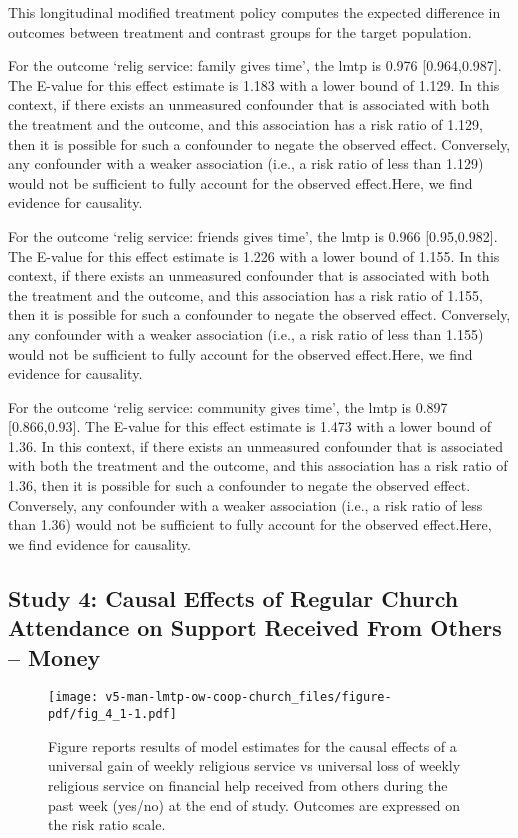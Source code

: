 \documentclass[
  singlecolumn]{article}
\begin{document}
This longitudinal modified treatment policy computes the expected
difference in outcomes between treatment and contrast groups for the
target population.

For the outcome `relig service: family gives time', the lmtp is 0.976
{[}0.964,0.987{]}. The E-value for this effect estimate is 1.183 with a
lower bound of 1.129. In this context, if there exists an unmeasured
confounder that is associated with both the treatment and the outcome,
and this association has a risk ratio of 1.129, then it is possible for
such a confounder to negate the observed effect. Conversely, any
confounder with a weaker association (i.e., a risk ratio of less than
1.129) would not be sufficient to fully account for the observed
effect.Here, we find evidence for causality.

For the outcome `relig service: friends gives time', the lmtp is 0.966
{[}0.95,0.982{]}. The E-value for this effect estimate is 1.226 with a
lower bound of 1.155. In this context, if there exists an unmeasured
confounder that is associated with both the treatment and the outcome,
and this association has a risk ratio of 1.155, then it is possible for
such a confounder to negate the observed effect. Conversely, any
confounder with a weaker association (i.e., a risk ratio of less than
1.155) would not be sufficient to fully account for the observed
effect.Here, we find evidence for causality.

For the outcome `relig service: community gives time', the lmtp is 0.897
{[}0.866,0.93{]}. The E-value for this effect estimate is 1.473 with a
lower bound of 1.36. In this context, if there exists an unmeasured
confounder that is associated with both the treatment and the outcome,
and this association has a risk ratio of 1.36, then it is possible for
such a confounder to negate the observed effect. Conversely, any
confounder with a weaker association (i.e., a risk ratio of less than
1.36) would not be sufficient to fully account for the observed
effect.Here, we find evidence for causality.

\newpage{}

\subsection{Study 4: Causal Effects of Regular Church Attendance on
Support Received From Others --
Money}\label{study-4-causal-effects-of-regular-church-attendance-on-support-received-from-others-money}

\begin{figure}[H]

{\centering \texttt{[image: v5-man-lmtp-ow-coop-church\_files/figure-pdf/fig\_4\_1-1.pdf]}

}

\caption{Figure reports results of model estimates for the causal
effects of a universal gain of weekly religious service vs universal
loss of weekly religious service on financial help received from others
during the past week (yes/no) at the end of study. Outcomes are
expressed on the risk ratio scale.}

\end{figure}%
\end{document}
